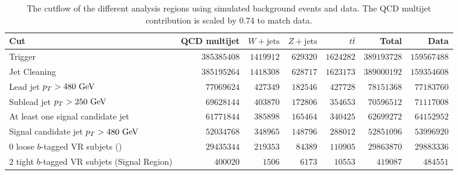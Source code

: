 \begin{table}[htpb]
 \centering
 \caption[The cutflow of the different analysis regions using simulated background events and data.]{%
  The cutflow of the different analysis regions using simulated background events and data.
  The QCD multijet contribution is scaled by 0.74 to match data.}
 \begin{adjustbox}{max width=\textwidth}
  \begin{tabular}{@{}lrrrrrr@{}}
   \toprule
   Cut                                             & QCD multijet & $W+\mathrm{jets}$ & $Z+\mathrm{jets}$ & $t\bar{t}$ & Total       & Data        \\ \midrule
   Trigger                                         & $385385408$  & $1419912$         & $629320$          & $1624282$  & $389193728$ & $159567488$ \\
   Jet Cleaning                                    & $385195264$  & $1418308$         & $628717$          & $1623173$  & $389000192$ & $159354608$ \\
   Lead \largeR{} jet $p_{T} > 480~\mathrm{GeV}$           & $77069624$   & $427349$          & $182546$          & $427728$   & $78151368$  & $77183760$  \\
   Sublead \largeR{} jet $p_{T} > 250~\mathrm{GeV}$        & $69628144$   & $403870$          & $172806$          & $354653$   & $70596512$  & $71117008$  \\
   At least one signal candidate jet               & $61771844$   & $385898$          & $165464$          & $340425$   & $62699272$  & $64152952$  \\
   Signal candidate jet $p_{T} > 480~\mathrm{GeV}$         & $52034768$   & $348965$          & $148796$          & $288012$   & $52851096$  & $53996920$  \\
   $0$ loose $b$-tagged VR subjets (\CRQCD{})      & $29435344$   & $219353$          & $84389$           & $110905$   & $29863870$  & $29883336$  \\
   $2$ tight $b$-tagged VR subjets (Signal Region) & $400020$     & $1506$            & $6173$            & $10553$    & $419087$    & $484551$    \\
   \bottomrule
  \end{tabular}
 \end{adjustbox}
 \label{table:cutflow}
\end{table}

